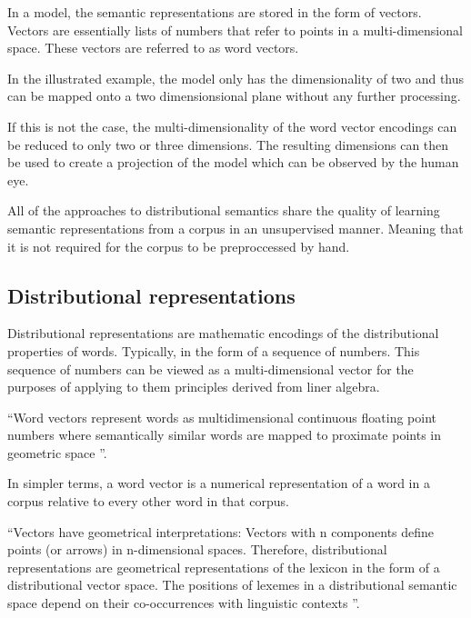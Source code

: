 \documentclass[14pt, a4paper]{extreport}
\begin{document}
In a model, the semantic representations are stored in the form of vectors. Vectors are essentially lists of numbers that refer to points in a multi-dimensional space. These vectors are referred to as word vectors.

In the illustrated example, the model only has the dimensionality of two and thus can be mapped onto a two dimensionsional plane without any further processing.

If this is not the case, the multi-dimensionality of the word vector encodings can be reduced to only two or three dimensions. The resulting dimensions can then be used to create a projection of the model which can be observed by the human eye.

All of the approaches to distributional semantics share the quality of learning semantic representations from a corpus in an unsupervised manner. Meaning that it is not required for the corpus to be preproccessed by hand.

\subsection{Distributional representations}
Distributional representations are mathematic encodings of the distributional properties of words. Typically, in the form of a sequence of numbers. This sequence of numbers can be viewed as a multi-dimensional vector for the purposes of applying to them principles derived from liner algebra.

``Word vectors represent words as multidimensional continuous floating point numbers where semantically similar words are mapped to proximate points in geometric space \parencite{ahireintro}''.

In simpler terms, a word vector is a numerical representation of a word in a corpus relative to every other word in that corpus.


``Vectors have geometrical interpretations: Vectors with n components define points (or arrows) in n-dimensional spaces. Therefore, distributional representations are geometrical representations of the lexicon in the form of a distributional vector space. The positions of lexemes in a distributional semantic space depend on their co-occurrences with linguistic contexts \parencite{lenci}''.
\end{document}
